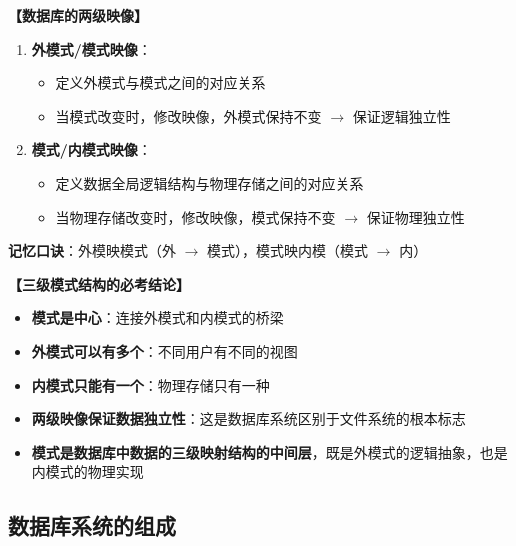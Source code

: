 \documentclass[12pt, a4paper]{article}
\newenvironment{bluebox}[1]{%
  \begin{trivlist}
  \item[\hskip\labelsep \textbf{#1}]
  \setlength{\parskip}{0.5ex}
  \setlength{\itemsep}{0.5ex}
}{%
  \end{trivlist}
}
\begin{document}
\begin{bluebox}{两级映像}
	\textbf{【数据库的两级映像】}

	\begin{enumerate}[leftmargin=*, label=\textbf{\arabic*.}]
		\item \textbf{外模式/模式映像}：
		      \begin{itemize}
			      \item 定义外模式与模式之间的对应关系
			      \item 当模式改变时，修改映像，外模式保持不变 $\rightarrow$ 保证逻辑独立性
		      \end{itemize}

		\item \textbf{模式/内模式映像}：
		      \begin{itemize}
			      \item 定义数据全局逻辑结构与物理存储之间的对应关系
			      \item 当物理存储改变时，修改映像，模式保持不变 $\rightarrow$ 保证物理独立性
		      \end{itemize}
	\end{enumerate}

	\textbf{记忆口诀}：外模映模式（外 $\rightarrow$ 模式），模式映内模（模式 $\rightarrow$ 内）
\end{bluebox}

\begin{bluebox}{重要结论}
	\textbf{【三级模式结构的必考结论】}

	\begin{itemize}
		\item \textbf{模式是中心}：连接外模式和内模式的桥梁
		\item \textbf{外模式可以有多个}：不同用户有不同的视图
		\item \textbf{内模式只能有一个}：物理存储只有一种
		\item \textbf{两级映像保证数据独立性}：这是数据库系统区别于文件系统的根本标志
		\item \textbf{模式是数据库中数据的三级映射结构的中间层}，既是外模式的逻辑抽象，也是内模式的物理实现
	\end{itemize}
\end{bluebox}

\subsection{数据库系统的组成}
\end{document}
